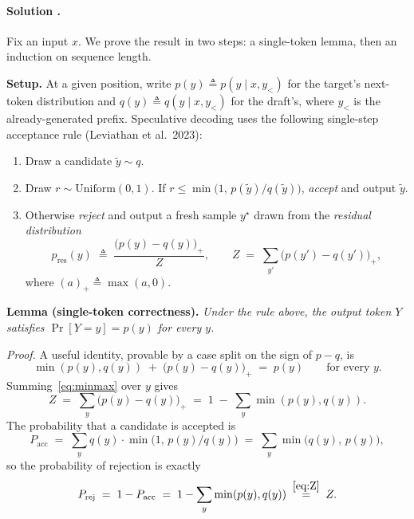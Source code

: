 \documentclass{article}
\newcounter{solutionCount}
\newcommand{\solution}[1]{
    \stepcounter{solutionCount}
    \paragraph{Solution \thesolutionCount.}
    {
        #1
    }
}
\begin{document}
\solution{
    Fix an input $x$. We prove the result in two steps: a single-token lemma, then an induction on sequence length.

    \textbf{Setup.} At a given position, write $p(y) \triangleq p(y \mid x, y_{<})$ for the target's next-token distribution and $q(y) \triangleq q(y \mid x, y_{<})$ for the draft's, where $y_{<}$ is the already-generated prefix. Speculative decoding uses the following single-step acceptance rule (Leviathan et al.~2023):
    \begin{enumerate}
        \item[(a)] Draw a candidate $\tilde y \sim q$.
        \item[(b)] Draw $r \sim \mathrm{Uniform}(0,1)$. If $r \le \min\!\bigl(1,\, p(\tilde y)/q(\tilde y)\bigr)$, \emph{accept} and output $\tilde y$.
        \item[(c)] Otherwise \emph{reject} and output a fresh sample $y^\star$ drawn from the \emph{residual distribution}
        \begin{equation}
            p_{\mathrm{res}}(y) \;\triangleq\; \frac{\bigl(p(y) - q(y)\bigr)_{+}}{Z}, \qquad
            Z \;=\; \sum_{y'} \bigl(p(y') - q(y')\bigr)_{+},
            \label{eq:residual}
        \end{equation}
        where $(a)_+ \triangleq \max(a, 0)$.
    \end{enumerate}

    \textbf{Lemma (single-token correctness).} \emph{Under the rule above, the output token $Y$ satisfies $\Pr[Y = y] = p(y)$ for every $y$.}

    \emph{Proof.} A useful identity, provable by a case split on the sign of $p - q$, is
    \begin{equation}
        \min(p(y), q(y)) \;+\; \bigl(p(y) - q(y)\bigr)_{+} \;=\; p(y) \qquad \text{for every } y.
        \label{eq:minmax}
    \end{equation}
    Summing~\eqref{eq:minmax} over $y$ gives
    \begin{equation}
        Z \;=\; \sum_{y} \bigl(p(y) - q(y)\bigr)_{+} \;=\; 1 \;-\; \sum_{y} \min(p(y), q(y)).
        \label{eq:Z}
    \end{equation}
    The probability that a candidate is accepted is
    \begin{equation*}
        P_{\mathrm{acc}} \;=\; \sum_{y} q(y) \cdot \min\!\bigl(1,\, p(y)/q(y)\bigr) \;=\; \sum_{y} \min\bigl(q(y),\, p(y)\bigr),
    \end{equation*}
    so the probability of rejection is exactly
    \begin{equation}
        P_{\mathrm{rej}} \;=\; 1 - P_{\mathrm{acc}} \;=\; 1 - \sum_{y} \min(p(y), q(y)) \;\overset{\eqref{eq:Z}}{=}\; Z.
        \label{eq:reject}
    \end{equation}

}
\end{document}
